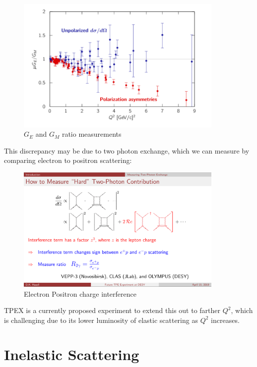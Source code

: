               
        \begin{figure}[H]
            \centering
            \includegraphics[width=10cm]{NuclearPhysics/modules/lepton-scattering/pics/elastic-ep/olympus-form-factors.PNG}
            \caption{$G_E$ and $G_M$ ratio measurements}
        \end{figure}
        
        This discrepancy may be due to two photon exchange, which we can measure by comparing electron to positron scattering:
        
              
        \begin{figure}[H]
            \centering
            \includegraphics[width=10cm]{NuclearPhysics/modules/lepton-scattering/pics/elastic-ep/tpex.PNG}
            \caption{Electron Positron charge interference}
        \end{figure}
    
    
        TPEX is a currently proposed experiment to extend this out to farther $Q^2$, which is challenging due to its lower luminosity of elastic scattering as $Q^2$ increases.     
       
\chapter{Inelastic Scattering}
